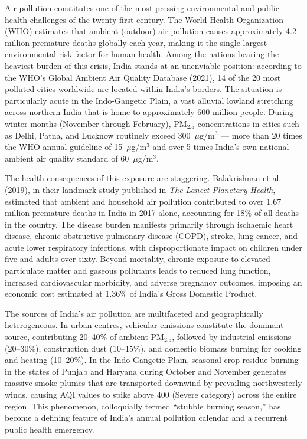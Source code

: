 \documentclass[12pt,a4paper]{report}
\begin{document}
Air pollution constitutes one of the most pressing environmental and public health challenges of the twenty-first century. The World Health Organization (WHO) estimates that ambient (outdoor) air pollution causes approximately 4.2 million premature deaths globally each year, making it the single largest environmental risk factor for human health. Among the nations bearing the heaviest burden of this crisis, India stands at an unenviable position: according to the WHO's Global Ambient Air Quality Database (2021), 14 of the 20 most polluted cities worldwide are located within India's borders. The situation is particularly acute in the Indo-Gangetic Plain, a vast alluvial lowland stretching across northern India that is home to approximately 600 million people. During winter months (November through February), PM$_{2.5}$ concentrations in cities such as Delhi, Patna, and Lucknow routinely exceed 300~$\mu$g/m$^3$ --- more than 20 times the WHO annual guideline of 15~$\mu$g/m$^3$ and over 5 times India's own national ambient air quality standard of 60~$\mu$g/m$^3$.

The health consequences of this exposure are staggering. Balakrishnan et al. (2019), in their landmark study published in \textit{The Lancet Planetary Health}, estimated that ambient and household air pollution contributed to over 1.67 million premature deaths in India in 2017 alone, accounting for 18\% of all deaths in the country. The disease burden manifests primarily through ischaemic heart disease, chronic obstructive pulmonary disease (COPD), stroke, lung cancer, and acute lower respiratory infections, with disproportionate impact on children under five and adults over sixty. Beyond mortality, chronic exposure to elevated particulate matter and gaseous pollutants leads to reduced lung function, increased cardiovascular morbidity, and adverse pregnancy outcomes, imposing an economic cost estimated at 1.36\% of India's Gross Domestic Product.

The sources of India's air pollution are multifaceted and geographically heterogeneous. In urban centres, vehicular emissions constitute the dominant source, contributing 20--40\% of ambient PM$_{2.5}$, followed by industrial emissions (20--30\%), construction dust (10--15\%), and domestic biomass burning for cooking and heating (10--20\%). In the Indo-Gangetic Plain, seasonal crop residue burning in the states of Punjab and Haryana during October and November generates massive smoke plumes that are transported downwind by prevailing northwesterly winds, causing AQI values to spike above 400 (Severe category) across the entire region. This phenomenon, colloquially termed ``stubble burning season,'' has become a defining feature of India's annual pollution calendar and a recurrent public health emergency.
\end{document}
